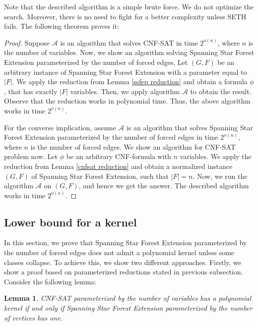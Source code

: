 \documentclass[en]{pracamgr}
\newtheorem{lemma}{Lemma}
\theoremstyle{definition}
\newcommand{\ssfep}{{\sc Spanning Star Forest Extension}}
\newcommand{\cnfsat}{{\sc CNF-SAT}}
\begin{document}
Note that the described algorithm is a simple brute force. We do not optimize the search. Moreover, there is no need to fight for a better complexity unless SETH fails. The following theorem proves it:

\thmssfepseth*

\begin{proof}
	Suppose $\mathcal{A}$ is an algorithm that solves \cnfsat{} in time $2^{o(n)}$, where $n$ is the number of variables. Now, we show an algorithm solving \ssfep{} parameterized by the number of forced edges. Let $(G,F)$ be an arbitrary instance of \ssfep{} with a parameter equal to $|F|$. We apply the reduction from Lemma \ref{ssfep reduction} and obtain a formula $\phi$, that has exactly $|F|$ variables. Then, we apply algorithm $\mathcal{A}$ to obtain the result. Observe that the reduction works in polynomial time. Thus, the above algorithm works in time $2^{o(n)}$.
	
	For the converse implication, assume $\mathcal{A}$ is an algorithm that solves \ssfep{} parameterized by the number of forced edges in time $2^{o(n)}$, where $n$ is the number of forced edges. We show an algorithm for \cnfsat{} problem now. Let $\phi$ be an arbitrary CNF-formula with $n$ variables. We apply the reduction from Lemma \ref{cnfsat reduction} and obtain a normalized instance $(G,F)$ of \ssfep{}, such that $|F|=n$. Now, we run the algorithm $\mathcal{A}$ on $(G,F)$, and hence we get the answer. The described algorithm works in time $2^{o(n)}$.
\end{proof}

\subsection{Lower bound for a kernel}

In this section, we prove that \ssfep{} parameterized by the number of forced edges does not admit a polynomial kernel unless some classes collapse. To achieve this, we show two different approaches. Firstly, we show a proof based on parameterized reductions stated in previous subsection. Consider the following lemma:

\begin{lemma}\label{kernel}
	\cnfsat{} parameterized by the number of variables has a polynomial kernel if and only if \ssfep{} parameterized by the number of vertices has one.
\end{lemma}
\end{document}
